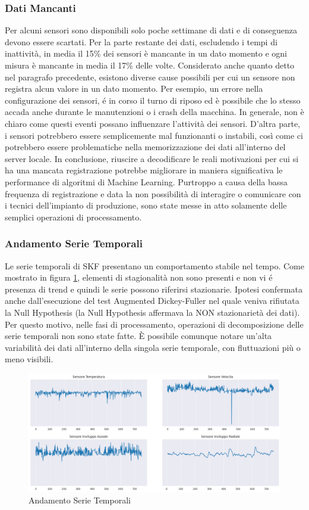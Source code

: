 \subsubsection{Dati Mancanti}
Per alcuni sensori sono disponibili solo poche settimane di dati e di conseguenza devono essere scartati. Per la parte restante dei dati, escludendo i tempi di inattività, in media il 15\% dei sensori è mancante in un dato momento e ogni misura è mancante in media il 17\% delle volte. Considerato anche quanto detto nel paragrafo precedente, esistono diverse cause possibili per cui un sensore non registra alcun valore in un dato momento. Per esempio, un errore nella configurazione dei sensori, é in corso il turno di riposo ed è possibile che lo stesso accada anche durante le manutenzioni o i crash della macchina.
In generale, non è chiaro come questi eventi possano influenzare l'attività dei sensori. D'altra parte, i sensori potrebbero essere semplicemente mal funzionanti o instabili, così come ci potrebbero essere problematiche nella memorizzazione dei dati all'interno del server locale. 
In conclusione, riuscire a decodificare le reali motivazioni per cui si ha una mancata registrazione potrebbe migliorare in maniera significativa le performance di algoritmi di Machine Learning. Purtroppo a causa della bassa frequenza di registrazione e data la non possibilità di interagire o comunicare con i tecnici dell'impianto di produzione, sono state messe in atto solamente delle semplici operazioni di processamento.

\subsubsection{Andamento Serie Temporali}
Le serie temporali di SKF presentano un comportamento stabile nel tempo. Come mostrato in figura \ref{sensors_plot}, elementi di stagionalità non sono presenti e non vi é presenza di trend e quindi le serie possono riferirsi stazionarie. Ipotesi confermata anche dall'esecuzione del test Augmented Dickey-Fuller nel quale veniva rifiutata la Null Hypothesis (la Null Hypothesis affermava la NON stazionarietà dei dati).
Per questo motivo, nelle fasi di processamento, operazioni di decomposizione delle serie temporali non sono state fatte.
È possibile comunque notare un'alta variabilità dei dati all'interno della singola serie temporale, con fluttuazioni più o meno visibili.
\begin{figure}[t]
	\centering
	\includegraphics[width=14cm, scale=1]{images/sensors_plot}
	\caption{Andamento Serie Temporali}
	\label{sensors_plot}
		
\end{figure}

